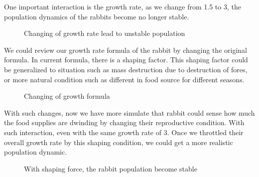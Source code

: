 \documentclass{article}
\begin{document}
\begin{normalsize}
		One important interaction is the growth rate, as we change from 1.5 to 3, the population dynamics of the rabbits become no longer stable.
			\begin{figure}[H]
			\caption{Changing of growth rate lead to unstable population }
		\end{figure}
		
		We could review our growth rate formula of the rabbit by changing the original formula. In current formula, there is a shaping factor. This shaping factor could be generalized to situation such as mass destruction due to destruction of fores, or more natural condition such as different in food source for different seasons.
		
		\begin{figure}[H]
			\caption{Changing of growth formula }
		\end{figure}
	
		With such changes, now we have more simulate that rabbit could sense how much the food supplies are dwinding by changing their reproductive condition. With such interaction, even with the same growth rate of 3. Once we throttled their overall growth rate by this shaping condition, we could get a more realistic population dynamic.
			\begin{figure}[H]
			\caption{With shaping force, the rabbit population become stable}
		\end{figure}
		

\end{normalsize}
\end{document}
